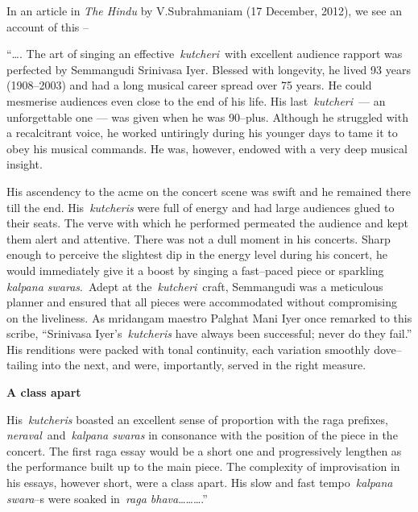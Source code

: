 In an article in \textit{The Hindu} by V.Subrahmaniam (17 December, 2012), we see an account of this –

\begin{myquote}
“…. The art of singing an effective \textit{kutcheri} with excellent audience rapport was perfected by Semmangudi Srinivasa Iyer. Blessed with longevity, he lived 93 years (1908–2003) and had a long musical career spread over 75 years. He could mesmerise audiences even close to the end of his life. His last \textit{kutcheri} — an unforgettable one — was given when he was 90–plus. Although he struggled with a recalcitrant voice, he worked untiringly during his younger days to tame it to obey his musical commands. He was, however, endowed with a very deep musical insight.
\end{myquote}

\begin{myquote}
His ascendency to the acme on the concert scene was swift and he remained there till the end. His \textit{kutcheris} were full of energy and had large audiences glued to their seats. The verve with which he performed permeated the audience and kept them alert and attentive. There was not a dull moment in his concerts. Sharp enough to perceive the slightest dip in the energy level during his concert, he would immediately give it a boost by singing a fast–paced piece or sparkling \textit{kalpana swaras}. Adept at the \textit{kutcheri} craft, Semmangudi was a meticulous planner and ensured that all pieces were accommodated without compromising on the liveliness. As mridangam maestro Palghat Mani Iyer once remarked to this scribe, “Srinivasa Iyer’s \textit{kutcheris} have always been successful; never do they fail.” His renditions were packed with tonal continuity, each variation smoothly dove–tailing into the next, and were, importantly, served in the right measure.
\end{myquote}

\textbf{A class apart}

\begin{myquote}
His \textit{kutcheris} boasted an excellent sense of proportion with the raga prefixes, \textit{neraval} and \textit{kalpana swaras} in consonance with the position of the piece in the concert. The first raga essay would be a short one and progressively lengthen as the performance built up to the main piece. The complexity of improvisation in his essays, however short, were a class apart. His slow and fast tempo \textit{kalpana swara}–s were soaked in \textit{raga bhava}……….”
\end{myquote}


